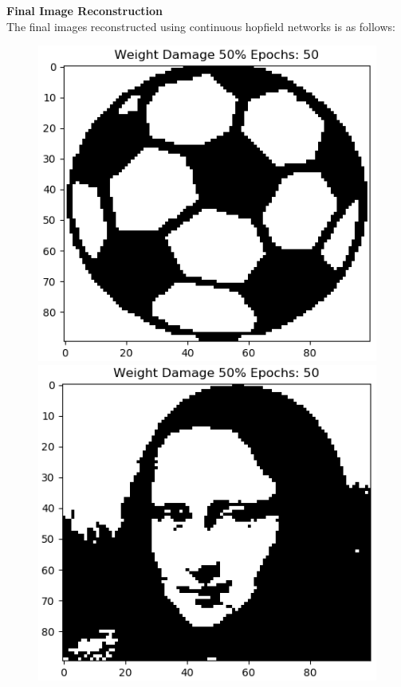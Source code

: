\documentclass[12pt,a4paper]{article}
\newcommand{\noi}{\noindent}
\begin{document}
\noi
\textbf{Final Image Reconstruction}\\
The final images reconstructed using continuous hopfield networks is as follows:
\begin{figure}[H]
\centering
\includegraphics[scale=0.34]{images/ball_chn_50_end.png}
\includegraphics[scale=0.34]{images/mona_chn_50_end.png}

\end{figure}
\end{document}
